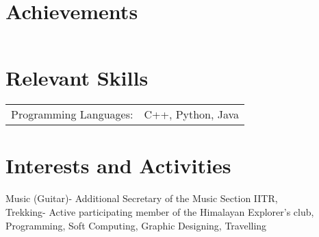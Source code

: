 \documentclass[a4paper,10pt]{article}
\begin{document}
\section{Achievements}
\begin{tabular}{rl}
\end{tabular}

\section{Relevant Skills}
\begin{tabular}{rl}
Programming Languages:& \textsc{C++}, Python, Java \setmainfont[SmallCapsFont=Fontin-SmallCaps.otf]{Fontin.otf}\\
\end{tabular}

\section{Interests and Activities}
Music (Guitar)- Additional Secretary of the Music Section IITR, \\
Trekking- Active participating member of the Himalayan Explorer's club,\\ Programming, Soft Computing, Graphic Designing, Travelling
\end{document}
